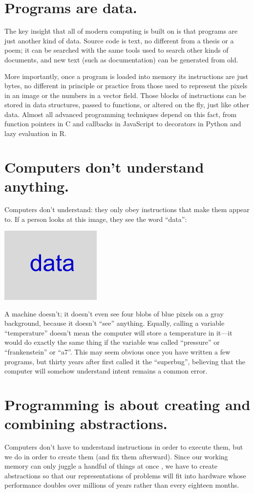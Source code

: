 \documentclass[10pt,letterpaper]{article}
\newcommand{\rulemajor}[1]{\section{#1}}
\begin{document}
\rulemajor{Programs are data.}

The key insight that all of modern computing is built on is that programs are
just another kind of data.  Source code is text, no different from a thesis or a
poem; it can be searched with the same tools used to search other kinds of
documents, and new text (such as documentation) can be generated from old.

More importantly, once a program is loaded into memory its instructions are just
bytes, no different in principle or practice from those used to represent the
pixels in an image or the numbers in a vector field.  Those blocks of
instructions can be stored in data structures, passed to functions, or altered
on the fly, just like other data.  Almost all advanced programming techniques
depend on this fact, from function pointers in C and callbacks in JavaScript to
decorators in Python and lazy evaluation in R.

\rulemajor{Computers don't understand anything.}

Computers don't understand: they only obey instructions that make them appear
to.  If a person looks at this image, they see the word ``data'':

\includegraphics[width=5.0cm]{data.png}

\noindent
A machine doesn't; it doesn't even see four blobs of blue pixels on a gray
background, because it doesn't ``see'' anything.  Equally, calling a variable
``temperature'' doesn't mean the computer will store a temperature in it---it
would do exactly the same thing if the variable was called ``pressure'' or
``frankenstein'' or ``a7''.  This may seem obvious once you have written a few
programs, but thirty years after \cite{Pea1986} first called it the
``superbug'', believing that the computer will somehow understand intent remains
a common error.

\rulemajor{Programming is about creating and combining abstractions.}

Computers don't have to understand instructions in order to execute them, but we
do in order to create them (and fix them afterward).  Since our working memory
can only juggle a handful of things at once \cite{Mill1956}, we have to create
abstractions so that our representations of problems will fit into hardware
whose performance doubles over millions of years rather than every eighteen
months.
\end{document}
